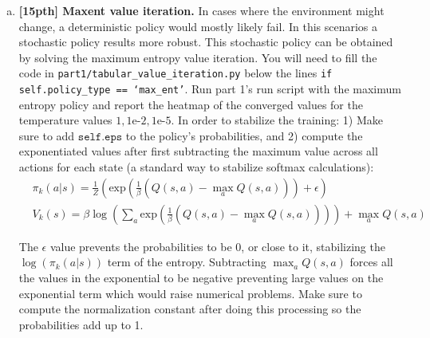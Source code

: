 \documentclass{article}
\begin{document}
\begin{enumerate}[(a)]
\newpage 

\item {\bf [15pth] Maxent value iteration.} In cases where the environment might change, a deterministic policy would mostly likely fail. In this scenarios a stochastic policy results more robust. This stochastic policy can be obtained by solving the maximum entropy value iteration.  You will need to fill the code in \texttt{part1/tabular\_value\_iteration.py} below the lines \texttt{if self.policy\_type == `max\_ent'}. Run part 1's run script with the maximum entropy policy and report the heatmap of the converged values for the temperature values $1, 1\text{e-}2, 1\text{e-}5$. In order to stabilize the training: 1) Make sure to add $\texttt{self.eps}$ to the policy's probabilities, and 2) compute the exponentiated values after first subtracting the maximum value across all actions for each state (a standard way to stabilize softmax calculations):
\begin{align*}
    &\pi_k(a|s) = \frac{1}{Z} \left( \text{exp} \left( \frac{1}{\beta}(Q(s, a) - \max_a Q(s, a)) \right) + \epsilon \right) \\
        &V_k(s) = \beta \log \left(\sum_a \text{exp}\left(\frac{1}{\beta}(Q(s, a) - \max_a Q(s, a))\right) \right) + \max_a Q(s, a)
\end{align*}

The $\epsilon$ value prevents the probabilities to be $0$, or close to it, stabilizing the $\log(\pi_k(a|s))$ term of the entropy. Subtracting $\max_a Q(s, a)$ forces all the values in the exponential to be negative preventing large values on the exponential term which would raise numerical problems. Make sure to compute the normalization constant after doing this processing so the probabilities add up to 1.


\end{enumerate}
\end{document}
